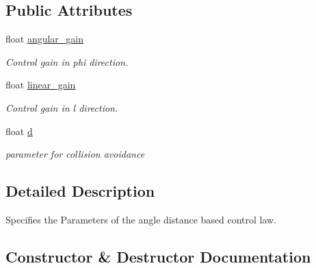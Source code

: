 \subsection*{Public Attributes}
\begin{DoxyCompactItemize}
\item 
float \hyperlink{structController_1_1AngleDistanceParameter_ac2bab50d5c5f357d05632e3abc463dbf}{angular\+\_\+gain}\hypertarget{structController_1_1AngleDistanceParameter_ac2bab50d5c5f357d05632e3abc463dbf}{}\label{structController_1_1AngleDistanceParameter_ac2bab50d5c5f357d05632e3abc463dbf}

\begin{DoxyCompactList}\small\item\em Control gain in phi direction. \end{DoxyCompactList}\item 
float \hyperlink{structController_1_1AngleDistanceParameter_a519dfcbf82e3e44a9a315b91964fa7de}{linear\+\_\+gain}\hypertarget{structController_1_1AngleDistanceParameter_a519dfcbf82e3e44a9a315b91964fa7de}{}\label{structController_1_1AngleDistanceParameter_a519dfcbf82e3e44a9a315b91964fa7de}

\begin{DoxyCompactList}\small\item\em Control gain in l direction. \end{DoxyCompactList}\item 
float \hyperlink{structController_1_1AngleDistanceParameter_a360e632b14647dce7dbadf168901880c}{d}\hypertarget{structController_1_1AngleDistanceParameter_a360e632b14647dce7dbadf168901880c}{}\label{structController_1_1AngleDistanceParameter_a360e632b14647dce7dbadf168901880c}

\begin{DoxyCompactList}\small\item\em parameter for collision avoidance \end{DoxyCompactList}\end{DoxyCompactItemize}


\subsection{Detailed Description}
Specifies the Parameters of the angle distance based control law. 

\subsection{Constructor \& Destructor Documentation}
